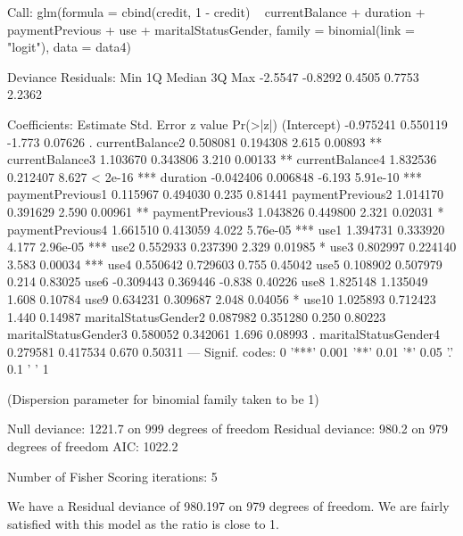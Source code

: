 \documentclass{article}
\begin{document}
\begin{Schunk}
\begin{Soutput}
Call:
glm(formula = cbind(credit, 1 - credit) ~ currentBalance + duration + 
    paymentPrevious + use + maritalStatusGender, family = binomial(link = "logit"), 
    data = data4)

Deviance Residuals: 
    Min       1Q   Median       3Q      Max  
-2.5547  -0.8292   0.4505   0.7753   2.2362  

Coefficients:
                      Estimate Std. Error z value Pr(>|z|)    
(Intercept)          -0.975241   0.550119  -1.773  0.07626 .  
currentBalance2       0.508081   0.194308   2.615  0.00893 ** 
currentBalance3       1.103670   0.343806   3.210  0.00133 ** 
currentBalance4       1.832536   0.212407   8.627  < 2e-16 ***
duration             -0.042406   0.006848  -6.193 5.91e-10 ***
paymentPrevious1      0.115967   0.494030   0.235  0.81441    
paymentPrevious2      1.014170   0.391629   2.590  0.00961 ** 
paymentPrevious3      1.043826   0.449800   2.321  0.02031 *  
paymentPrevious4      1.661510   0.413059   4.022 5.76e-05 ***
use1                  1.394731   0.333920   4.177 2.96e-05 ***
use2                  0.552933   0.237390   2.329  0.01985 *  
use3                  0.802997   0.224140   3.583  0.00034 ***
use4                  0.550642   0.729603   0.755  0.45042    
use5                  0.108902   0.507979   0.214  0.83025    
use6                 -0.309443   0.369446  -0.838  0.40226    
use8                  1.825148   1.135049   1.608  0.10784    
use9                  0.634231   0.309687   2.048  0.04056 *  
use10                 1.025893   0.712423   1.440  0.14987    
maritalStatusGender2  0.087982   0.351280   0.250  0.80223    
maritalStatusGender3  0.580052   0.342061   1.696  0.08993 .  
maritalStatusGender4  0.279581   0.417534   0.670  0.50311    
---
Signif. codes:  0 '***' 0.001 '**' 0.01 '*' 0.05 '.' 0.1 ' ' 1

(Dispersion parameter for binomial family taken to be 1)

    Null deviance: 1221.7  on 999  degrees of freedom
Residual deviance:  980.2  on 979  degrees of freedom
AIC: 1022.2

Number of Fisher Scoring iterations: 5
\end{Soutput}
\end{Schunk}
We have a Residual deviance of 980.197 on 979 degrees of freedom. We are fairly satisfied with this model as the ratio is close to 1.\\
\end{document}
